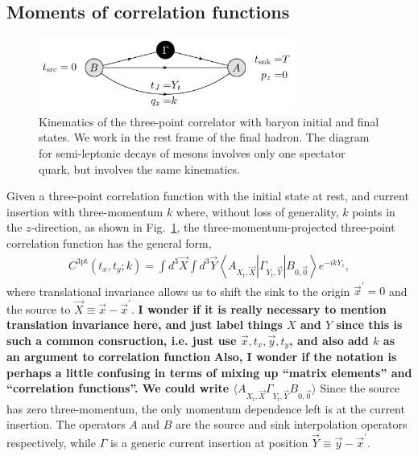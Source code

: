 \documentclass{PoS}
\newcommand{\dgr}[1]{\textcolor{David}{#1}}
\begin{document}
\subsection{Moments of correlation functions}
\begin{figure}[h]
	\centering
		\includegraphics[width=0.75\textwidth]{./3pt_kinematics.pdf}
	\caption{Kinematics of the three-point correlator with baryon initial and final states. We work in the rest frame of the final hadron. The diagram for semi-leptonic decays \dgr{of mesons} involves only one spectator quark, but involves the same kinematics.}
	\label{fig:3pt_kinematics}
\end{figure}

Given a three-point correlation function with the initial state at
rest, and current insertion with three-momentum $k$ where, without loss of generality,  $k$ points
in the $z$-direction, as shown in
Fig.~\ref{fig:3pt_kinematics}, the three-momentum-projected
three-point correlation function has the general form,
\begin{align}
C^{\text{3pt}}(t_x, t_y;k) = \int d^3\vec{X} \int d^3\vec{Y} \left<A_{X_t,\vec{X}}|\Gamma_{Y_t,\vec{Y}} |B_{0,\vec{0}}\right> e^{-ikY_z},
\label{eq:3pt}
\end{align}
where translational invariance allows us to shift the sink to the
origin $\vec{x}^\prime = 0$ and the source to $\vec{X}\equiv \vec{x} -
\vec{x}^\prime$. \dgr{\bfseries I wonder if it is really necessary to
  mention translation invariance here, and just label things $X$ and
  $Y$ since this is such a common consruction, i.e. just use $\vec{x}, t_x,
  \vec{y}, t_y$, and also add $k$ as an argument to correlation function} \dgr{\bfseries Also, I wonder if the notation is
  perhaps a little confusing in terms of mixing up ``matrix elements''
  and ``correlation functions''.  We could write $\langle A_{X_t,
    \vec{X}} \Gamma_{Y_t, \vec{Y}} B_{0,\vec{0}}\rangle$ } Since the
source has zero three-momentum, the only momentum dependence left is
at the current insertion. The operators $A$ and $B$ are the source and
sink interpolation operators respectively, while $\Gamma$ is a generic
current insertion at position $\vec{Y}\equiv \vec{y}-\vec{x}^\prime$.
\end{document}
